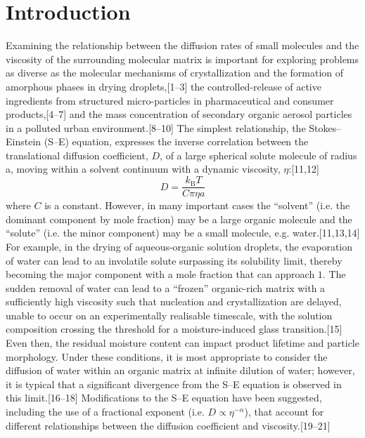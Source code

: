 \section{Introduction}
Examining the relationship between the diffusion rates of small molecules and the viscosity of the surrounding molecular matrix is important for exploring problems as diverse as the molecular mechanisms of crystallization and the formation of amorphous phases in drying droplets,[1–3] the controlled-release of active ingredients from structured micro-particles in pharmaceutical and consumer products,[4–7] and the mass concentration of secondary organic aerosol particles in a polluted urban environment.[8–10] The simplest relationship, the Stokes–Einstein (S–E) equation, expresses the inverse correlation between the translational diffusion coefficient, $D$, of a large spherical solute molecule of radius a, moving within a solvent continuum with a dynamic viscosity, $\eta$:[11,12]
\begin{equation}\label{eqn:diffusion}
D=\frac{k_{\mathrm{B}} T}{C \pi \eta a}
\end{equation}
where $C$ is a constant. However, in many important cases the ``solvent” (i.e. the dominant component by mole fraction) may be a large organic molecule and the ``solute” (i.e. the minor component) may be a small molecule, e.g. water.[11,13,14] For example, in the drying of aqueous-organic solution droplets, the evaporation of water can lead to an involatile solute surpassing its solubility limit, thereby becoming the major component with a mole fraction that can approach $1$. The sudden removal of water can lead to a ``frozen'' organic-rich matrix with a sufficiently high viscosity such that nucleation and crystallization are delayed, unable to occur on an experimentally realisable timescale, with the solution composition crossing the threshold for a moisture-induced glass transition.[15] Even then, the residual moisture content can impact product lifetime and particle morphology. Under these conditions, it is most appropriate to consider the diffusion of water within an organic matrix at infinite dilution of water; however, it is typical that a significant divergence from the S–E equation is observed in this limit.[16–18] Modifications to the S–E equation have been suggested, including the use of a fractional exponent (i.e. $D \propto \eta^{-\alpha}$), that account for different relationships between the diffusion coefficient and viscosity.[19–21]

